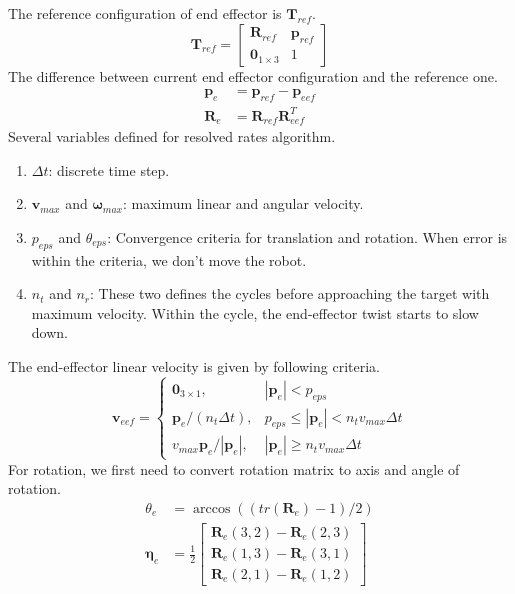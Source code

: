 \documentclass{article}
\begin{document}
The reference configuration of end effector is $\mathbf{T}_{ref}$.
\begin{equation}
\mathbf{T}_{ref} = \begin{bmatrix}\mathbf{R}_{ref} & \mathbf{p}_{ref} \\ \mathbf{0}_{1\times3} & 1\end{bmatrix}
\end{equation}
The difference between current end effector configuration and the reference one.
\begin{equation}
\begin{split}
\mathbf{p}_{e} & = \mathbf{p}_{ref} - \mathbf{p}_{eef}\\
\mathbf{R}_{e} & = \mathbf{R}_{ref}  \mathbf{R}_{eef}^T
\end{split}
\end{equation}
Several variables defined for resolved rates algorithm.
\begin{enumerate}
\item $\Delta t$: discrete time step.
\item $\mathbf{v}_{max}$ and $\boldsymbol{\omega}_{max}$: maximum linear and angular velocity.
\item $p_{eps}$ and $\theta_{eps}$: Convergence criteria for translation and rotation. When error is within the criteria, we don't move the robot.
\item $n_t$ and $n_r$: These two defines the cycles before approaching the target with maximum velocity. Within the cycle, the end-effector twist starts to slow down.
\end{enumerate}
The end-effector linear velocity is given by following criteria.
\begin{equation}
\mathbf{v}_{eef} = \left\{\begin{matrix}
\mathbf{0}_{3\times1}, & |\mathbf{p}_{e} | < p_{eps} \\ 
\mathbf{p}_{e}/(n_t \Delta t), & p_{eps} \leqslant |\mathbf{p}_{e} | < n_t v_{max} \Delta t\\ 
v_{max} \mathbf{p}_e / |\mathbf{p}_e|, & |\mathbf{p}_{e} | \geqslant n_t v_{max} \Delta t
\end{matrix}\right.
\end{equation}
For rotation, we first need to convert rotation matrix to axis and angle of rotation.
\begin{equation}
\begin{split}
\theta_e & =\arccos((tr(\mathbf{R}_e)-1)/2)\\
\boldsymbol{\eta}_e &= \frac{1}{2}\begin{bmatrix} \mathbf{R}_e(3,2) - \mathbf{R}_e(2,3) \\ \mathbf{R}_e(1,3) - \mathbf{R}_e(3,1) \\ \mathbf{R}_e(2,1) - \mathbf{R}_e(1,2) \end{bmatrix}
\end{split}
\end{equation}
\end{document}
